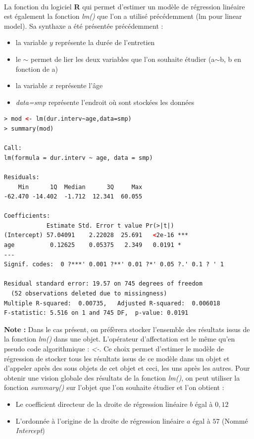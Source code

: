 \\
La fonction du logiciel \textbf{R} qui permet d'estimer un modèle de régression linéaire est également la fonction \textit{lm()} que l'on a utilisé précédemment (lm pour linear model).\newline
Sa synthaxe a été présentée précédemment : 
\begin{itemize}
\item la variable $y$ représente la durée de l'entretien
\item le $\sim$ permet de lier les deux variables que l'on souhaite étudier (a$\sim$b, b en fonction de a)
\item la variable $x$ représente l'âge
\item \textit{data=smp} représente l'endroit où sont stockées les données
\end{itemize} 
\begin{lstlisting}[language=html]
> mod <- lm(dur.interv~age,data=smp)
> summary(mod)

Call:
lm(formula = dur.interv ~ age, data = smp)

Residuals:
    Min      1Q  Median      3Q     Max 
-62.470 -14.402  -1.712  12.341  60.055 

Coefficients:
            Estimate Std. Error t value Pr(>|t|)    
(Intercept) 57.04091    2.22028  25.691   <2e-16 ***
age          0.12625    0.05375   2.349   0.0191 *  
---
Signif. codes:  0 ?***' 0.001 ?**' 0.01 ?*' 0.05 ?.' 0.1 ? ' 1

Residual standard error: 19.57 on 745 degrees of freedom
  (52 observations deleted due to missingness)
Multiple R-squared:  0.00735,	Adjusted R-squared:  0.006018 
F-statistic: 5.516 on 1 and 745 DF,  p-value: 0.0191
\end{lstlisting}
\textbf{Note : } Dans le cas présent, on préfèrera stocker l'ensemble des résultats issus de la fonction \textit{lm()} dans une objet. L'opérateur d'affectation est le même qu'en pseudo code algorithmique : \textit{<-}. \newline
Ce choix permet d'estimer le modèle de régression de stocker tous les résultats issus de ce modèle dans un objet et d'appeler après des sous objets de cet objet et ceci, les uns après les autres.\newline
Pour obtenir une vision globale des résultats de la fonction \textit{lm()}, on peut utiliser la fonction \textit{summary()} sur l'objet que l'on souhaite étudier et l'on obtient : 
\begin{itemize}
\item Le coefficient directeur de la droite de régression linéaire $b$ égal à $0,12$
\item L'ordonnée à l'origine de la droite de régression linéaire $a$ égal à $57$ (Nommé \textit{Intercept})
\end{itemize}
